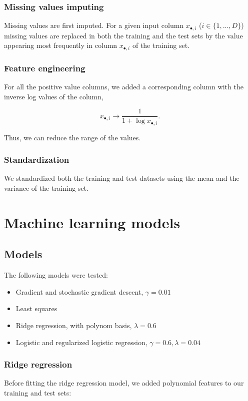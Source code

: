\documentclass[10pt,conference,compsocconf]{IEEEtran}
\begin{document}
\subsubsection{Missing values imputing}
Missing values are first imputed. For a given input column $x_{\bullet,i}$ ($i \in \{1, ..., D\}$) missing values are replaced in both the training and the test sets by the value appearing most frequently in column $x_{\bullet,i}$ of the training set.

\subsubsection{Feature engineering}
For all the positive value columns, we added a corresponding column with the inverse log values of the column,

\[
x_{\bullet,i} \to \frac{1}{1+\log x_{\bullet,i}}.
\]

Thus, we can reduce the range of the values.

\subsubsection{Standardization}
We standardized both the training and test datasets using the mean and the variance of the training set.

\section{Machine learning models}

\subsection{Models}

The following models were tested:
\begin{itemize}
\item Gradient and stochastic gradient descent, $\gamma=0.01$
\item Least squares
\item Ridge regression, with polynom basis, $\lambda=0.6$
\item Logistic and regularized logistic regression, $\gamma=0.6, \lambda=0.04$
\end{itemize}

\subsubsection{Ridge regression}
Before fitting the ridge regression model, we added polynomial features to our training and test sets:
\end{document}
